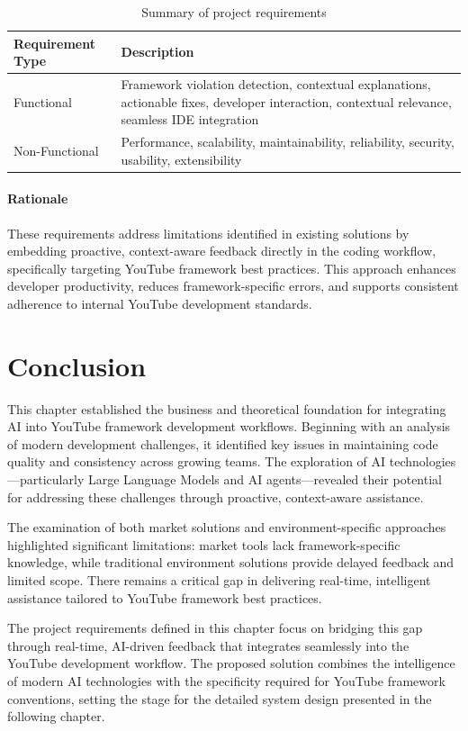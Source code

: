 \begin{spacing}{1.2}
\begin{table}[H]
\centering
\begin{tabular}{|p{6cm}|p{8cm}|}
\hline
\textbf{Requirement Type} & \textbf{Description} \\
\hline
Functional & Framework violation detection, contextual explanations, actionable fixes, developer interaction, contextual relevance, seamless IDE integration \\
\hline
Non-Functional & Performance, scalability, maintainability, reliability, security, usability, extensibility \\
\hline
\end{tabular}
\caption{Summary of project requirements}
\label{tab:extended_requirements}
\end{table}

\paragraph{Rationale}
These requirements address limitations identified in existing solutions by embedding proactive, context-aware feedback directly in the coding workflow, specifically targeting YouTube framework best practices. This approach enhances developer productivity, reduces framework-specific errors, and supports consistent adherence to internal YouTube development standards.


\section*{Conclusion}
This chapter established the business and theoretical foundation for integrating AI into YouTube framework development workflows. Beginning with an analysis of modern development challenges, it identified key issues in maintaining code quality and consistency across growing teams. The exploration of AI technologies—particularly Large Language Models and AI agents—revealed their potential for addressing these challenges through proactive, context-aware assistance.

The examination of both market solutions and environment-specific approaches highlighted significant limitations: market tools lack framework-specific knowledge, while traditional environment solutions provide delayed feedback and limited scope. There remains a critical gap in delivering real-time, intelligent assistance tailored to YouTube framework best practices.

The project requirements defined in this chapter focus on bridging this gap through real-time, AI-driven feedback that integrates seamlessly into the YouTube development workflow. The proposed solution combines the intelligence of modern AI technologies with the specificity required for YouTube framework conventions, setting the stage for the detailed system design presented in the following chapter.  








\end{spacing}


